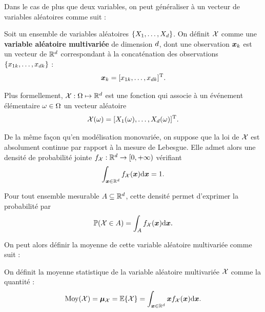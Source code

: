 Dans le cas de plus que deux variables, on peut généraliser à un vecteur de variables aléatoires comme suit :

\begin{definition}
\label{def:context-definition-vecteuraleatoire}
  Soit un ensemble de variables aléatoires
  $\{X_1,\dots,X_d\}$.
  On définit $\mathcal{X}$ comme une \textbf{variable aléatoire
  multivariée} de dimension $d$, dont une observation
  $\boldsymbol{x}_k$ est un vecteur de $\mathbb{R}^d$ correspondant à la
  concaténation des observations
  $\{x_{1k},\dots,x_{dk}\}$ :
\begin{equation}
  \boldsymbol{x}_{k}
  =
  [x_{1k},\dots,x_{dk}]^{\mathrm{T}}.
  \label{eq:context-definition-observation-vector}
\end{equation}

\end{definition}

  Plus formellement,
  $\mathcal{X}:\Omega\mapsto\mathbb{R}^d$ est une fonction qui associe
  à un événement élémentaire $\omega\in\Omega$ un vecteur aléatoire
\begin{equation*}
  \mathcal{X}(\omega)
  =
  [X_1(\omega),\dots,X_d(\omega)]^{\mathrm{T}}.
\end{equation*}

  De la même façon qu'en modélisation monovariée, on suppose que la loi de $\mathcal{X}$ est absolument continue par
  rapport à la mesure de Lebesgue. Elle admet alors une densité de
  probabilité jointe $f_{\mathcal{X}}:\mathbb{R}^d\to[0,+\infty)$
  vérifiant
  \begin{equation*}
    \int_{\boldsymbol{x}\in\mathbb{R}^d}
    f_{\mathcal{X}}(\boldsymbol{x})\mathrm{d}\boldsymbol{x}
    =
    1.
  \end{equation*}

  Pour tout ensemble mesurable $A\subseteq\mathbb{R}^d$, cette densité
  permet d'exprimer la probabilité par
  \begin{equation}
    \operatorname{\mathbb{P}}(\mathcal{X}\in A)
    =
    \int_A
    f_{\mathcal{X}}(\boldsymbol{x})\mathrm{d}\boldsymbol{x}.
    \label{eq:context-definition-ddpmultivariee}
  \end{equation}


On peut alors définir la moyenne de cette variable aléatoire multivariée
comme suit :

\begin{definition}
\label{def:context-definition-moyennemultivariee}
  On définit la moyenne statistique de la variable aléatoire multivariée
  $\mathcal{X}$ comme la quantité :
\begin{equation}
  \operatorname{\operatorname{Moy}}(\mathcal{X})
  =
  \boldsymbol{\mu}_{\mathcal{X}}
  =
  \operatorname{\mathbb{E}}\{\mathcal{X}\}
  =
  \int_{\boldsymbol{x}\in\mathbb{R}^d}
  \boldsymbol{x}f_{\mathcal{X}}(\boldsymbol{x})\mathrm{d}\boldsymbol{x}.
  \label{eq:context-definition-moyennemultivariee}
\end{equation}
\end{definition}


